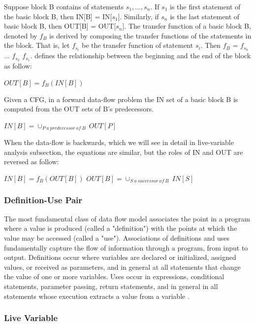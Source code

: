 Suppose block B contains of statements $s_{1},...,s_{n}$. If $s_{1}$ is the first statement of the basic block B, then IN[B] = IN[$s_{1}$]. Similarly, if $s_{n}$ is the last statement of basic block B, then OUT[B] = OUT[$s_{n}$]. The transfer function of a basic block B, denoted by $f_{B}$ is derived by composing the transfer functions of the statements in the block. That is, let  $f_{s_{i}}$ be the transfer function of statement $s_{i}$. Then $f_{B}$ = $f_{s_{n}}$ \textopenbullet ... \textopenbullet $f_{s_{2}}$ \textopenbullet $f_{s_{1}}$. \cite{lam2006compilers} defines the relationship between the beginning and the end of the block as follow:
\begin{algorithmic}\centering
\State${OUT[B] = f_{B}(IN[B])}$
\end{algorithmic}
Given a CFG, in a forward data-flow problem the IN set of a basic block B is computed from the OUT sets of B's predecessors. 
\begin{algorithmic}\centering
\State${IN[B] = \cup_{P\:a\:predecessor\:of\:B}\:OUT[P]}$
\end{algorithmic}
When the data-flow is backwards, which we will see in detail in live-variable analysis subsection, the equations are similar, but the roles of IN and OUT are reversed as follow:
\begin{algorithmic}\centering
\State${IN[B] = f_{B}(OUT[B])}$
\State${OUT[B] = \cup_{S\:a\:successor\:of\:B}\:IN[S]}$
\end{algorithmic}

\subsubsection{Definition-Use Pair}
The most fundamental class of data flow model associates the point in a program where a value is produced (called a "definition") with the points at which the value may be accessed (called a "use"). Associations of definitions and uses fundamentally capture the flow of information through a program, from input to output. Definitions occur where variables are declared or initialized, assigned values, or received as parameters, and in general at all statements that change the value of one or more variables. Uses occur in expressions, conditional statements, parameter passing, return statements, and in general in all statements whose execution extracts a value from a variable \cite{young2008software}.

\subsubsection{Live Variable}

